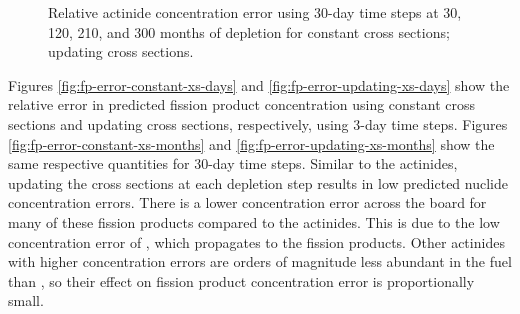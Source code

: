    \begin{figure}[h!tpb]
        \centering
        \caption[]{Relative actinide concentration error using 30-day time steps
            at 30,
                120, 210, and 300 months of depletion for
             constant cross
            sections;
             updating cross
            sections.}
    \end{figure}

    Figures \ref{fig:fp-error-constant-xs-days} and
    \ref{fig:fp-error-updating-xs-days} show the relative error in predicted
    fission product concentration using constant cross sections and updating
    cross sections, respectively, using 3-day time steps. Figures
    \ref{fig:fp-error-constant-xs-months} and
    \ref{fig:fp-error-updating-xs-months} show the same respective quantities
    for 30-day time steps. Similar to the actinides, updating the cross sections
    at each depletion step results in low predicted nuclide concentration
    errors. There is a lower concentration error across the board for
    many of these fission products compared to the actinides. This is due to the
    low concentration error of , which propagates to the
    fission products. Other actinides with higher concentration errors are
    orders of magnitude less abundant in the fuel than , so their
    effect on fission product concentration error is proportionally small.

